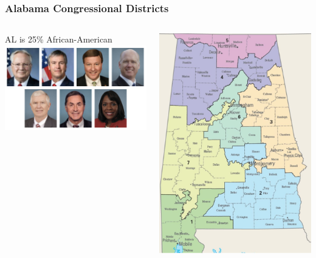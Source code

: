 \documentclass[red]{beamer}
\begin{document}
    \begin{frame} [t]
    \frametitle{Alabama Congressional Districts}
    \begin{columns}
    \begin{column}{0.45\textwidth}
    AL is 25\% African-American
    \includegraphics[scale = .62]{AL_reps.png}
    \label{fig:AL_reps}
    \end{column}
    \begin{column}{0.40\textwidth}
    \includegraphics[scale = .30]{AL_electoral_map.png}

\end{column}
\end{columns}
\end{frame}
\end{document}

